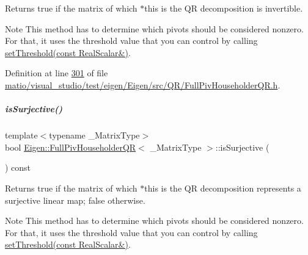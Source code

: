 \begin{DoxyReturn}{Returns}
true if the matrix of which $\ast$this is the QR decomposition is invertible.
\end{DoxyReturn}
\begin{DoxyNote}{Note}
This method has to determine which pivots should be considered nonzero. For that, it uses the threshold value that you can control by calling \hyperlink{group___q_r___module_a92277e572bf98245891015d12dd2b602}{set\+Threshold(const Real\+Scalar\&)}. 
\end{DoxyNote}


Definition at line \hyperlink{matio_2visual__studio_2test_2eigen_2_eigen_2src_2_q_r_2_full_piv_householder_q_r_8h_source_l00301}{301} of file \hyperlink{matio_2visual__studio_2test_2eigen_2_eigen_2src_2_q_r_2_full_piv_householder_q_r_8h_source}{matio/visual\+\_\+studio/test/eigen/\+Eigen/src/\+Q\+R/\+Full\+Piv\+Householder\+Q\+R.\+h}.

\mbox{\label{group___q_r___module_aa3593db4708ce9079b0bdf219b99f57e}} 
\subparagraph{\texorpdfstring{is\+Surjective()}{isSurjective()}\hspace{0.1cm}{\footnotesize\ttfamily [1/2]}}
{\footnotesize\ttfamily template$<$typename \+\_\+\+Matrix\+Type$>$ \\
bool \hyperlink{group___q_r___module_class_eigen_1_1_full_piv_householder_q_r}{Eigen\+::\+Full\+Piv\+Householder\+QR}$<$ \+\_\+\+Matrix\+Type $>$\+::is\+Surjective (\begin{DoxyParamCaption}{ }\end{DoxyParamCaption}) const\hspace{0.3cm}{\ttfamily [inline]}}

\begin{DoxyReturn}{Returns}
true if the matrix of which $\ast$this is the QR decomposition represents a surjective linear map; false otherwise.
\end{DoxyReturn}
\begin{DoxyNote}{Note}
This method has to determine which pivots should be considered nonzero. For that, it uses the threshold value that you can control by calling \hyperlink{group___q_r___module_a92277e572bf98245891015d12dd2b602}{set\+Threshold(const Real\+Scalar\&)}. 
\end{DoxyNote}


